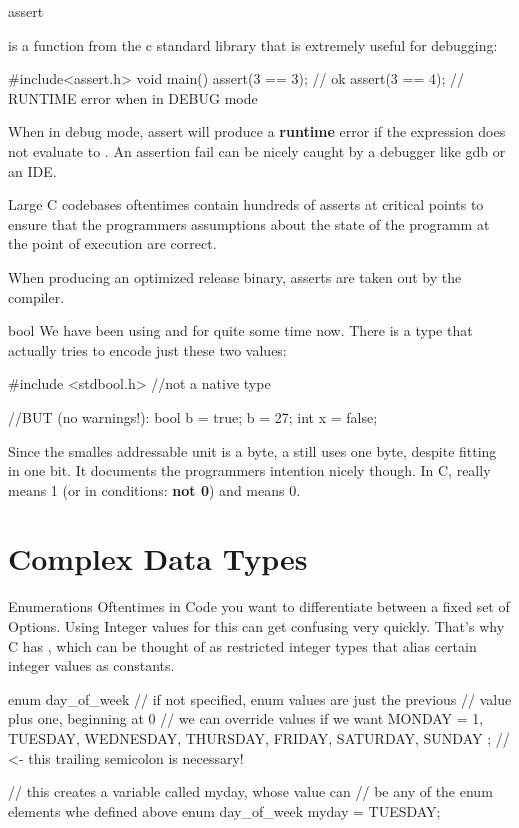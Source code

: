 \documentclass[10pt,graphics,aspectratio=169,table]{beamer}
\begin{document}
\begin{frame}[fragile]{assert}

 is a function from the c standard library that is extremely useful 
for debugging:

\begin{codeblock}
#include<assert.h> 
void main(){ 
    assert(3 == 3); // ok
    assert(3 == 4); // RUNTIME error when in DEBUG mode
}
\end{codeblock}

When in debug mode, assert will produce a \textbf{runtime} error if the
expression does not evaluate to . An assertion fail can be
nicely caught by a debugger like gdb or an IDE.

Large C codebases oftentimes contain hundreds of asserts at critical points
to ensure that the programmers assumptions about the state of the programm
at the point of execution are correct. 

When producing an optimized release binary, asserts are taken out
by the compiler. 

\end{frame} 

\begin{frame}[fragile]{bool}
    We have been using  and  for quite some time now.
    There is a type that actually tries to encode just these two values: 
    \begin{codeblock}
#include <stdbool.h> //not a native type

//BUT (no warnings!): 
bool b = true;
b = 27; 
int x = false;
    \end{codeblock}

    Since the smalles addressable unit is a byte, a  still uses one
    byte, despite fitting in one bit. It documents the programmers intention 
    nicely though. In C,  really means 1 (or in conditions: \textbf{not 0})
    and  means 0.
\end{frame} 

\section{Complex Data Types}

\begin{frame}[fragile]{Enumerations}
    Oftentimes in Code you want to differentiate between a fixed set of Options.
    Using Integer values for this can get confusing very quickly. That's why
    C has , which can be thought of as restricted integer types 
    that alias certain integer values as constants.
    \begin{codeblock}
enum day_of_week{
    // if not specified, enum values are just the previous
    // value plus one, beginning at 0
    // we can override values if we want  
    MONDAY = 1,  
    TUESDAY, WEDNESDAY, THURSDAY,
    FRIDAY, SATURDAY, SUNDAY
}; // <- this trailing semicolon is necessary!

// this creates a variable called myday, whose value can
// be any of the enum elements whe defined above
enum day_of_week myday = TUESDAY; 
    \end{codeblock}
\end{frame}
\end{document}
